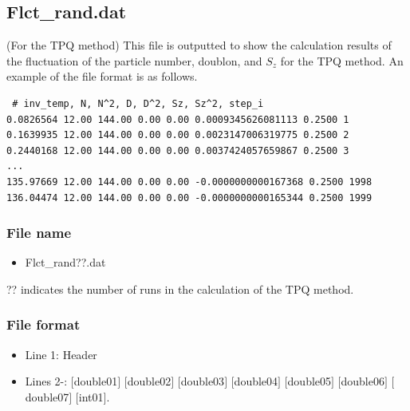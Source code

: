 \newpage
\subsection{Flct\_rand.dat}
\label{Subsec:flctrand}
(For the TPQ method) This file is outputted to show the calculation results of the fluctuation of the particle number, doublon, and $S_z$ for the TPQ method.
An example of the file format is as follows.\\

\begin{minipage}{15cm}
\begin{screen}
\begin{verbatim}
 # inv_temp, N, N^2, D, D^2, Sz, Sz^2, step_i
0.0826564 12.00 144.00 0.00 0.00 0.0009345626081113 0.2500 1
0.1639935 12.00 144.00 0.00 0.00 0.0023147006319775 0.2500 2
0.2440168 12.00 144.00 0.00 0.00 0.0037424057659867 0.2500 3
...
135.97669 12.00 144.00 0.00 0.00 -0.0000000000167368 0.2500 1998
136.04474 12.00 144.00 0.00 0.00 -0.0000000000165344 0.2500 1999
\end{verbatim}
\end{screen}
\end{minipage}

\subsubsection{File name}
 \begin{itemize}
   \item Flct\_rand??.dat
  \end{itemize}
  ?? indicates the number of runs in the calculation of the TPQ method.

\subsubsection{File format}
\begin{itemize}
   \item Line 1: Header
   \item Lines 2-: $[$double01$]$ $[$double02$]$ $[$double03$]$ $[$double04$]$ $[$double05$]$ $[$double06$]$ $[$double07$]$ $[$int01$]$.
  \end{itemize}

